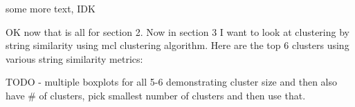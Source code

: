 

some more text, IDK




OK now that is all for section 2.  Now in section 3 I want to look at clustering by string similarity using mcl clustering algorithm.  Here are the top 6 clusters using various string similarity metrics:

TODO - multiple boxplots for all 5-6 demonstrating cluster size and then also have \# of clusters, pick smallest number of clusters and then use that.




